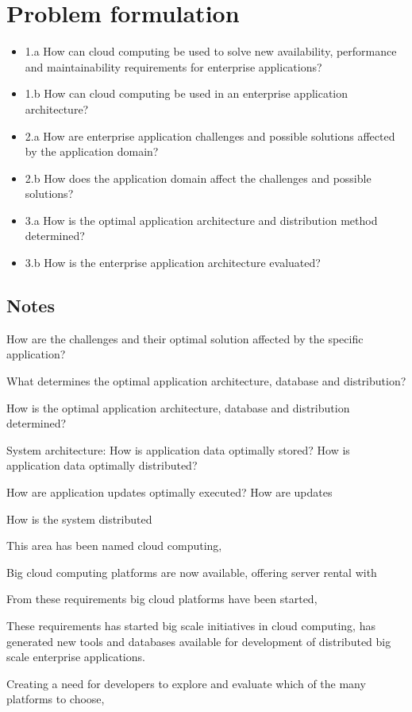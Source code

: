 \section{Problem formulation}
\label{sc:problem_formulation}

\begin{itemize}  
\item 1.a How can cloud computing be used to solve new availability, performance and maintainability requirements for enterprise applications?
\item 1.b How can cloud computing be used in an enterprise application architecture?

\item 2.a How are enterprise application challenges and possible solutions affected by the application domain?
\item 2.b How does the application domain affect the challenges and possible solutions?

\item 3.a How is the optimal application architecture and distribution method determined?
\item 3.b How is the enterprise application architecture evaluated?
\end{itemize}

\subsection*{Notes}
How are the challenges and their optimal solution affected by the specific application?

What determines the optimal application architecture, database and distribution?

How is the optimal application architecture, database and distribution determined?

System architecture:
How is application data optimally stored?
How is application data optimally distributed?

How are application updates optimally executed?
How are updates 

How is the system distributed

This area has been named cloud computing, 

Big cloud computing platforms are now available, offering server rental with 

From these requirements big cloud platforms have been started, 

These requirements has started big scale initiatives in cloud computing, has generated new tools and databases available for development of distributed big scale enterprise applications. 

Creating a need for developers to explore and evaluate which of the many platforms to choose, 